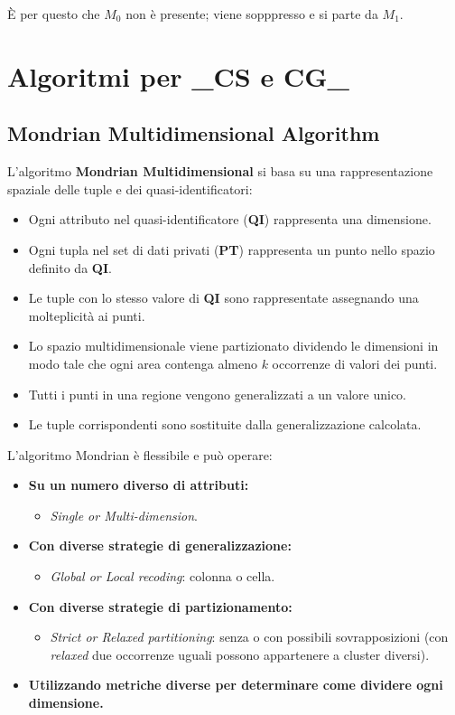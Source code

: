 \documentclass{report}
\begin{document}
È per questo che $M_0$ non è presente; viene sopppresso e si parte da $M_1$.


\newpage
\section{Algoritmi per \_CS e CG\_}

\subsection{Mondrian Multidimensional Algorithm}
L'algoritmo \textbf{Mondrian Multidimensional} si basa su una rappresentazione spaziale delle tuple e dei quasi-identificatori:

\begin{itemize}
    \item Ogni attributo nel quasi-identificatore (\textbf{QI}) rappresenta una dimensione.
    \item Ogni tupla nel set di dati privati (\textbf{PT}) rappresenta un punto nello spazio definito da \textbf{QI}.
    \item Le tuple con lo stesso valore di \textbf{QI} sono rappresentate assegnando una molteplicità ai punti.
    \item Lo spazio multidimensionale viene partizionato dividendo le dimensioni in modo tale che ogni area contenga almeno $k$ occorrenze di valori dei punti. 
    \item Tutti i punti in una regione vengono generalizzati a un valore unico.
    \item Le tuple corrispondenti sono sostituite dalla generalizzazione calcolata.
\end{itemize}

\noindent L'algoritmo Mondrian è flessibile e può operare:
\begin{itemize}
    \item \textbf{Su un numero diverso di attributi:} 
    \begin{itemize}
        \item \textit{Single or Multi-dimension}.
    \end{itemize}
    \item \textbf{Con diverse strategie di generalizzazione:}
    \begin{itemize}
        \item \textit{Global or Local recoding}: colonna o cella.
    \end{itemize}
    \item \textbf{Con diverse strategie di partizionamento:} 
    \begin{itemize}
        \item \textit{Strict or Relaxed partitioning}: senza o con possibili sovrapposizioni (con \textit{relaxed} due occorrenze uguali possono appartenere a cluster diversi).
    \end{itemize}
    \item \textbf{Utilizzando metriche diverse per determinare come dividere ogni dimensione.}
\end{itemize}
\end{document}
